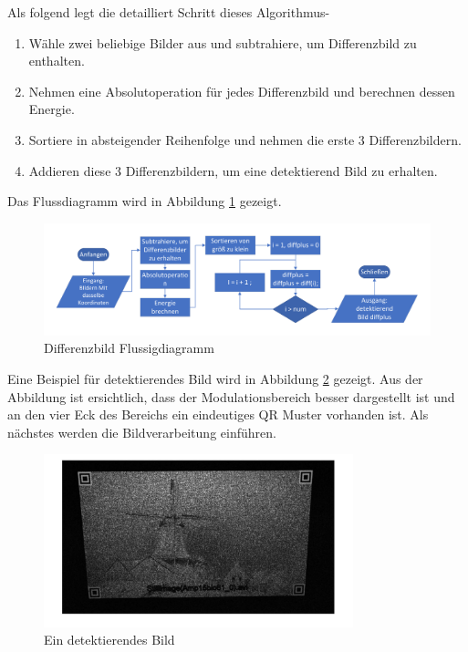 Als folgend legt die detailliert Schritt dieses Algorithmus-

\begin{enumerate}
	\item Wähle zwei beliebige Bilder aus und subtrahiere, um Differenzbild zu enthalten.
	\item Nehmen eine Absolutoperation für jedes Differenzbild und berechnen dessen Energie. 
	\item Sortiere in absteigender Reihenfolge und nehmen die erste 3 Differenzbildern.
	\item Addieren diese 3 Differenzbildern, um eine detektierend Bild zu erhalten.
\end{enumerate}

Das Flussdiagramm wird in Abbildung \ref{fig:DifferenzbildFlussigdiagramm} gezeigt.
\begin{figure}[H]
 \centering 
 \includegraphics[keepaspectratio,width=1.1\textwidth]{images/3_Ersteverfahren/Differenzbild/Differenzbildflussigdiagramm.pdf}
 \caption{Differenzbild Flussigdiagramm}
 \label{fig:DifferenzbildFlussigdiagramm}
\end{figure} 

Eine Beispiel für detektierendes Bild wird in Abbildung \ref{fig:EindetektierendesBild} gezeigt. Aus der Abbildung ist ersichtlich, dass der Modulationsbereich besser dargestellt ist und an den vier Eck des Bereichs ein eindeutiges QR Muster vorhanden ist. Als nächstes werden die Bildverarbeitung einführen.

\begin{figure}[H]
 \centering 
 \includegraphics[keepaspectratio,width=0.8\textwidth]{images/3_Ersteverfahren/Differenzbild/diffplus.pdf}
 \caption{Ein detektierendes Bild}
 \label{fig:EindetektierendesBild}
\end{figure} 


